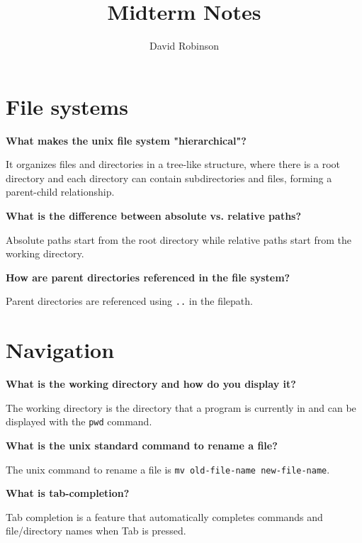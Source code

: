\documentclass{article}
\title{Midterm Notes}
\author{David Robinson}
\date{}
\begin{document}
\maketitle

\section*{File systems}
\textbf{What makes the unix file system "hierarchical"?}

It organizes files and directories in a tree-like structure, where there is a root directory and each directory can contain subdirectories and files, forming a parent-child relationship.

\vspace{1em}
\textbf{What is the difference between absolute vs. relative paths?}

Absolute paths start from the root directory while relative paths start from the working directory.

\vspace{1em}
\textbf{How are parent directories referenced in the file system?}

Parent directories are referenced using \texttt{..} in the filepath.

\section*{Navigation}
\textbf{What is the working directory and how do you display it?}

The working directory is the directory that a program is currently in and can be displayed with the \texttt{pwd} command.

\vspace{1em}
\textbf{What is the unix standard command to rename a file?}

The unix command to rename a file is \texttt{mv old-file-name new-file-name}.

\vspace{1em}
\textbf{What is tab-completion?}

Tab completion is a feature that automatically completes commands and file/directory names when Tab is pressed.
\end{document}
